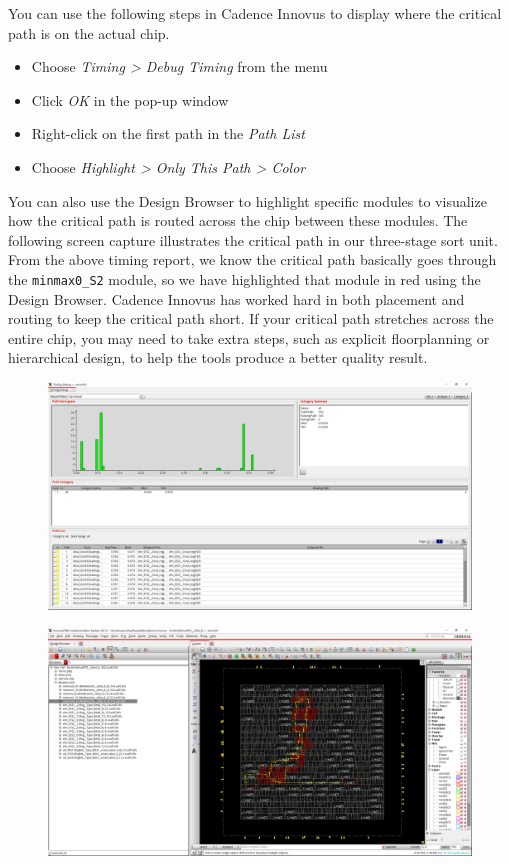 \documentclass[a4paper,12pt,twoside]{article}
\begin{document}
You can use the following steps in Cadence Innovus to display where the critical path is on the actual chip.
\begin{itemize}
    \item Choose \textit{Timing > Debug Timing} from the menu
    \item Click \textit{OK} in the pop-up window
    \item Right-click on the first path in the \textit{Path List}
    \item Choose \textit{Highlight > Only This Path > Color}
\end{itemize}
You can also use the Design Browser to highlight specific modules to visualize how the critical path is routed across the chip between these modules. The following screen capture illustrates the critical path in our three-stage sort unit. From the above timing report, we know the critical path basically goes through the \texttt{minmax0\_S2} module, so we have highlighted that module in red using the Design Browser. Cadence Innovus has worked hard in both placement and routing to keep the critical path short. If your critical path stretches across the entire chip, you may need to take extra steps, such as explicit floorplanning or hierarchical design, to help the tools produce a better quality result.
\begin{figure}[H]
    \centering
    \includegraphics[width=\textwidth]{images/19.png}
\end{figure}
\begin{figure}[H]
    \centering
    \includegraphics[width=\textwidth]{images/20.png}
\end{figure}
\end{document}
